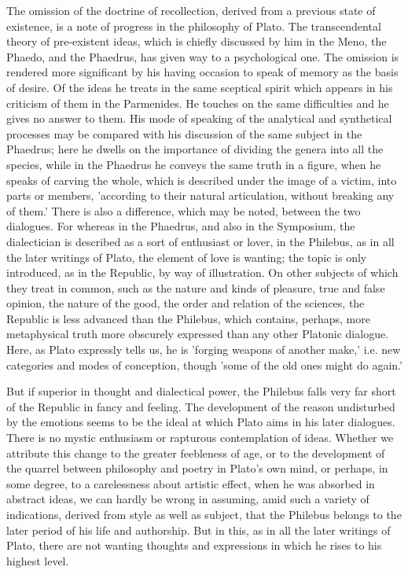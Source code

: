 \documentclass[11pt,letter]{article}
\begin{document}
\par  The omission of the doctrine of recollection, derived from a previous state of existence, is a note of progress in the philosophy of Plato. The transcendental theory of pre-existent ideas, which is chiefly discussed by him in the Meno, the Phaedo, and the Phaedrus, has given way to a psychological one. The omission is rendered more significant by his having occasion to speak of memory as the basis of desire. Of the ideas he treats in the same sceptical spirit which appears in his criticism of them in the Parmenides. He touches on the same difficulties and he gives no answer to them. His mode of speaking of the analytical and synthetical processes may be compared with his discussion of the same subject in the Phaedrus; here he dwells on the importance of dividing the genera into all the species, while in the Phaedrus he conveys the same truth in a figure, when he speaks of carving the whole, which is described under the image of a victim, into parts or members, 'according to their natural articulation, without breaking any of them.' There is also a difference, which may be noted, between the two dialogues. For whereas in the Phaedrus, and also in the Symposium, the dialectician is described as a sort of enthusiast or lover, in the Philebus, as in all the later writings of Plato, the element of love is wanting; the topic is only introduced, as in the Republic, by way of illustration. On other subjects of which they treat in common, such as the nature and kinds of pleasure, true and false opinion, the nature of the good, the order and relation of the sciences, the Republic is less advanced than the Philebus, which contains, perhaps, more metaphysical truth more obscurely expressed than any other Platonic dialogue. Here, as Plato expressly tells us, he is 'forging weapons of another make,' i.e. new categories and modes of conception, though 'some of the old ones might do again.'

\par  But if superior in thought and dialectical power, the Philebus falls very far short of the Republic in fancy and feeling. The development of the reason undisturbed by the emotions seems to be the ideal at which Plato aims in his later dialogues. There is no mystic enthusiasm or rapturous contemplation of ideas. Whether we attribute this change to the greater feebleness of age, or to the development of the quarrel between philosophy and poetry in Plato's own mind, or perhaps, in some degree, to a carelessness about artistic effect, when he was absorbed in abstract ideas, we can hardly be wrong in assuming, amid such a variety of indications, derived from style as well as subject, that the Philebus belongs to the later period of his life and authorship. But in this, as in all the later writings of Plato, there are not wanting thoughts and expressions in which he rises to his highest level.
\end{document}
